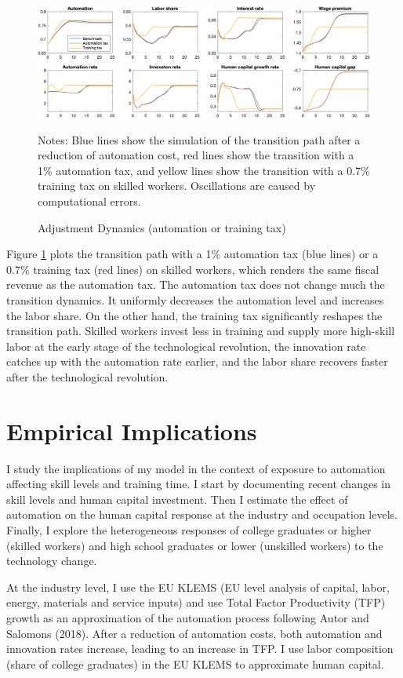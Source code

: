 \documentclass[12pt]{article}
\begin{document}
\begin{figure}[h!]
\includegraphics[width=\textwidth]{Transition3}
\caption{Adjustment Dynamics (automation or training tax)}
\label{transition3}
{\scriptsize Notes: Blue lines show the simulation of the transition path after a reduction of automation cost, red lines show the transition with a 1\% automation tax, and yellow lines show the transition with a 0.7\% training tax on skilled workers. Oscillations are caused by computational errors.}
\end{figure}

Figure \ref{transition3} plots the transition path with a 1\% automation tax (blue lines) or a 0.7\% training tax (red lines) on skilled workers, which renders the same fiscal revenue as the automation tax. The automation tax does not change much the transition dynamics. It uniformly decreases the automation level and increases the labor share. On the other hand, the training tax significantly reshapes the transition path. Skilled workers invest less in training and supply more high-skill labor at the early stage of the technological revolution, the innovation rate catches up with the automation rate earlier, and the labor share recovers faster after the technological revolution. 

\section{Empirical Implications}
I study the implications of my model in the context of exposure to automation affecting skill levels and training time. I start by documenting recent changes in skill levels and human capital investment. Then I estimate the effect of automation on the human capital response at the industry and occupation levels. Finally, I explore the heterogeneous responses of college graduates or higher (skilled workers) and high school graduates or lower (unskilled workers) to the technology change. 

At the industry level, I use the EU KLEMS (EU level analysis of capital, labor, energy, materials and service inputs) and use Total Factor Productivity (TFP) growth as an approximation of the automation process following Autor and Salomons (2018)\nocite{AutorSalomons2018}. After a reduction of automation costs, both automation and innovation rates increase, leading to an increase in TFP. I use labor composition (share of college graduates) in the EU KLEMS to approximate human capital. 
\end{document}

